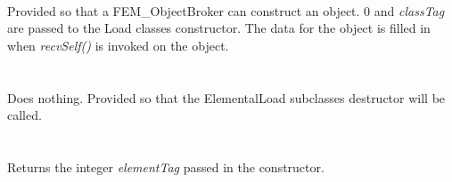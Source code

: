   \\
Provided so that a FEM\_ObjectBroker can construct an object. $0$ and
{\em classTag} are passed to the Load classes constructor. The data
for the object is filled in when {\em recvSelf()} is invoked on the
object.\\

 \\
\\ 
Does nothing. Provided so that the ElementalLoad subclasses destructor
will be called. \\

  \\
\indent{} \\
Returns the integer {\em elementTag} passed in the constructor. 
